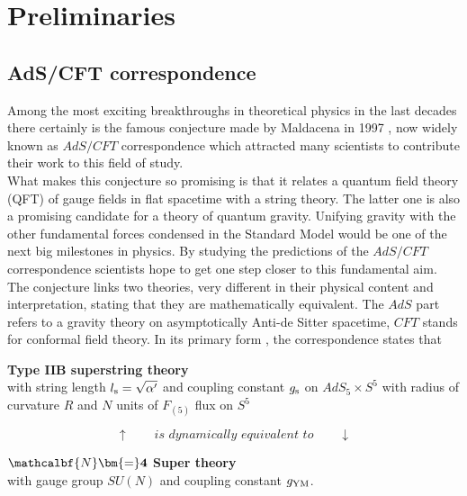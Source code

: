 \chapter{Preliminaries} \label{sec: preleminaries}
\section{AdS/CFT correspondence}
%
%
Among the most exciting breakthroughs in theoretical physics in the last decades there certainly is the famous conjecture made by Maldacena in 1997 \cite{maldacena1}, now widely known as $AdS/CFT$ correspondence which attracted many scientists to contribute their work to this field of study.\\
What makes this conjecture so promising is that it relates a quantum field theory (QFT) of gauge fields in flat spacetime with a string theory. The latter one is also a promising candidate for a theory of quantum gravity. Unifying gravity with the other fundamental forces condensed in the Standard Model would be one of the next big milestones in physics. By studying the predictions of the $AdS/CFT$ correspondence scientists hope to get one step closer to this fundamental aim.
The conjecture links two theories, very different in their physical content and interpretation, stating that they are mathematically equivalent.
The $AdS$ part refers to a gravity theory on asymptotically Anti-de Sitter spacetime,  $CFT$ stands for conformal field theory. In its primary form \cite{Ammon:2015wua}, the correspondence states that \\[0.2cm]
%
%
%
\begin{tcolorbox}[colback=white!95!black, colframe=white!90!black]
\begin{center}
\textbf{Type IIB superstring theory} \\
with string length $l_{\rm s}=\sqrt{\alpha'}$ and coupling constant $g_{\rm s}$ on $AdS_{5}\times S^{5}$ with radius of curvature $R$ and $N$ units of $F_{(5)}$ flux on $S^{5}$
\end{center}
\end{tcolorbox}
%
\begin{equation*}
\uparrow \qquad \textit{is dynamically equivalent to} \qquad \downarrow
\end{equation*}\hspace{1mm}
%
%
\begin{tcolorbox}[colback=white!95!black, colframe=white!90!black]
\begin{center}
\textbf{$\mathcalbf{N}\bm{=}\mathbf{4}$ Super  theory}\\
with gauge group $SU(N)$ and  coupling constant $g_{\rm YM}$.
\end{center}
\end{tcolorbox}
